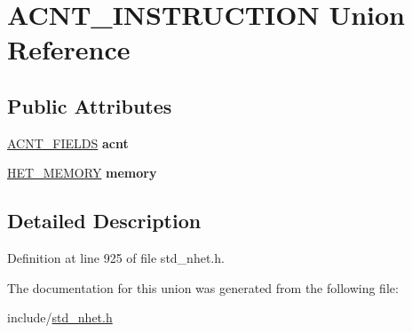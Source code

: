 \hypertarget{unionACNT__INSTRUCTION}{}\section{A\+C\+N\+T\+\_\+\+I\+N\+S\+T\+R\+U\+C\+T\+I\+ON Union Reference}
\label{unionACNT__INSTRUCTION}
\subsection*{Public Attributes}
\begin{DoxyCompactItemize}
\item 
\mbox{\label{unionACNT__INSTRUCTION_a805f24215d85dedc0891795ad1ea673e}} 
\mbox{\hyperlink{structacnt__format}{A\+C\+N\+T\+\_\+\+F\+I\+E\+L\+DS}} {\bfseries acnt}
\item 
\mbox{\label{unionACNT__INSTRUCTION_a780c3cd73ee50b1ec9669f22b939955a}} 
\mbox{\hyperlink{structmemory__format}{H\+E\+T\+\_\+\+M\+E\+M\+O\+RY}} {\bfseries memory}
\end{DoxyCompactItemize}


\subsection{Detailed Description}


Definition at line 925 of file std\+\_\+nhet.\+h.



The documentation for this union was generated from the following file\+:\begin{DoxyCompactItemize}
\item 
include/\mbox{\hyperlink{std__nhet_8h}{std\+\_\+nhet.\+h}}\end{DoxyCompactItemize}
